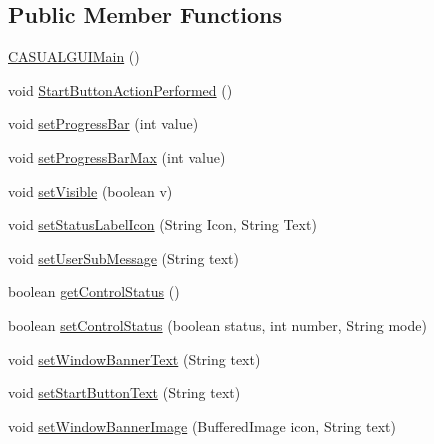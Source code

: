 \subsection*{Public Member Functions}
\begin{DoxyCompactItemize}
\item 
\hyperlink{class_g_u_i_1_1development_1_1_c_a_s_u_a_l_g_u_i_main_a7b75fd1a4dfe40b9b1bb76c34fa78525}{C\-A\-S\-U\-A\-L\-G\-U\-I\-Main} ()
\item 
void \hyperlink{class_g_u_i_1_1development_1_1_c_a_s_u_a_l_g_u_i_main_a1591bd6e9773eb113aa3cd5ea3a8651c}{Start\-Button\-Action\-Performed} ()
\item 
void \hyperlink{class_g_u_i_1_1development_1_1_c_a_s_u_a_l_g_u_i_main_a485021bf885eda530b3291470592b77c}{set\-Progress\-Bar} (int value)
\item 
void \hyperlink{class_g_u_i_1_1development_1_1_c_a_s_u_a_l_g_u_i_main_af248eecd00123cc7a6d5632cd345ba8a}{set\-Progress\-Bar\-Max} (int value)
\item 
void \hyperlink{class_g_u_i_1_1development_1_1_c_a_s_u_a_l_g_u_i_main_aece5df6056dcef63f5d26f47f20a7bdc}{set\-Visible} (boolean v)
\item 
void \hyperlink{class_g_u_i_1_1development_1_1_c_a_s_u_a_l_g_u_i_main_a170989ec0cb4c6fb7d0270728e465776}{set\-Status\-Label\-Icon} (String Icon, String Text)
\item 
void \hyperlink{class_g_u_i_1_1development_1_1_c_a_s_u_a_l_g_u_i_main_a1ad431a43a59e8acf25c2be36c29c17f}{set\-User\-Sub\-Message} (String text)
\item 
boolean \hyperlink{class_g_u_i_1_1development_1_1_c_a_s_u_a_l_g_u_i_main_a6719acd9ad3f7a0f402bbe2ce22b31a4}{get\-Control\-Status} ()
\item 
boolean \hyperlink{class_g_u_i_1_1development_1_1_c_a_s_u_a_l_g_u_i_main_a03643832a900fe8423652c98a510bc47}{set\-Control\-Status} (boolean status, int number, String mode)
\item 
void \hyperlink{class_g_u_i_1_1development_1_1_c_a_s_u_a_l_g_u_i_main_a07af5ccca23c6072cbf5f931bc17a07c}{set\-Window\-Banner\-Text} (String text)
\item 
void \hyperlink{class_g_u_i_1_1development_1_1_c_a_s_u_a_l_g_u_i_main_ae90fd8598f7b601352e62926f1315bea}{set\-Start\-Button\-Text} (String text)
\item 
void \hyperlink{class_g_u_i_1_1development_1_1_c_a_s_u_a_l_g_u_i_main_aaf873cc8622dd33a0be825e34edcdf35}{set\-Window\-Banner\-Image} (Buffered\-Image icon, String text)
\item 

\end{DoxyCompactItemize}

